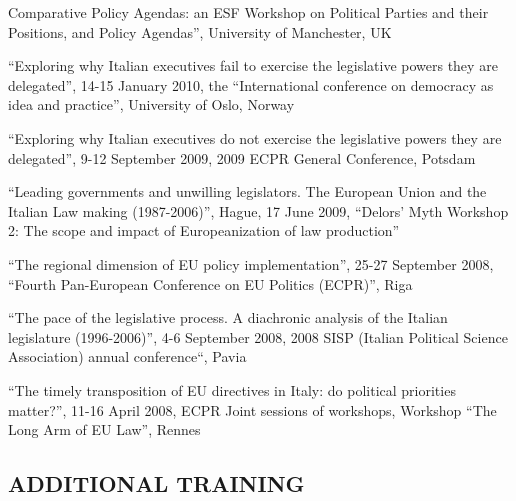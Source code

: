 \documentclass[11pt,]{article}
\renewenvironment{itemize}{
  \begin{list}{}{
    \setlength{\leftmargin}{1.5em}
  }
}{
  \end{list}
}
\begin{document}
\begin{itemize}
  Comparative Policy Agendas: an ESF Workshop on Political Parties and
  their Positions, and Policy Agendas'', University of Manchester, UK
\item
  ``Exploring why Italian executives fail to exercise the legislative
  powers they are delegated'', 14-15 January 2010, the ``International
  conference on democracy as idea and practice'', University of Oslo,
  Norway
\item
  ``Exploring why Italian executives do not exercise the legislative
  powers they are delegated'', 9-12 September 2009, 2009 ECPR General
  Conference, Potsdam
\item
  ``Leading governments and unwilling legislators. The European Union
  and the Italian Law making (1987-2006)'', Hague, 17 June 2009,
  ``Delors' Myth Workshop 2: The scope and impact of Europeanization of
  law production''
\item
  ``The regional dimension of EU policy implementation'', 25-27
  September 2008, ``Fourth Pan-European Conference on EU Politics
  (ECPR)'', Riga
\item
  ``The pace of the legislative process. A diachronic analysis of the
  Italian legislature (1996-2006)'', 4-6 September 2008, 2008 SISP
  (Italian Political Science Association) annual conference``, Pavia
\item
  ``The timely transposition of EU directives in Italy: do political
  priorities matter?'', 11-16 April 2008, ECPR Joint sessions of
  workshops, Workshop ``The Long Arm of EU Law'', Rennes
\end{itemize}

\hypertarget{additional-training}{%
\subsection{ADDITIONAL TRAINING}\label{additional-training}}
\end{document}
